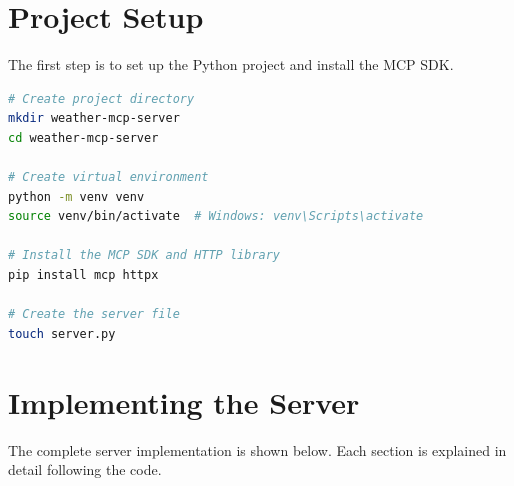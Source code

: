 \section{Project Setup}
The first step is to set up the Python project and install the MCP SDK.

\begin{lstlisting}[language=bash, caption={Setting up the MCP server project}]
# Create project directory
mkdir weather-mcp-server
cd weather-mcp-server

# Create virtual environment
python -m venv venv
source venv/bin/activate  # Windows: venv\Scripts\activate

# Install the MCP SDK and HTTP library
pip install mcp httpx

# Create the server file
touch server.py
\end{lstlisting}

\section{Implementing the Server}
The complete server implementation is shown below. Each section is explained in detail following the code.

